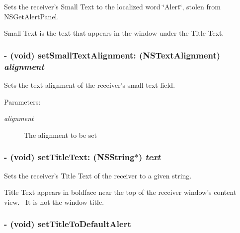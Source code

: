 Sets the receiver's Small Text to the localized word \char`\"{}Alert\char`\"{}, stolen from NSGetAlertPanel. 

Small Text is the text that appears in the window under the Title Text. \hypertarget{interface_s_s_y_alert_7742169df21e1a6a03f4efba3a913555}{
\subsubsection[{setSmallTextAlignment:}]{\setlength{\rightskip}{0pt plus 5cm}- (void) setSmallTextAlignment: (NSTextAlignment) {\em alignment}}}
\label{interface_s_s_y_alert_7742169df21e1a6a03f4efba3a913555}


Sets the text alignment of the receiver's small text field. 

\begin{Desc}
\item[Parameters:]
\begin{description}
\item[{\em alignment}]The alignment to be set \end{description}
\end{Desc}
\hypertarget{interface_s_s_y_alert_e215fbf01c8ec15042ec40bb23429482}{
\subsubsection[{setTitleText:}]{\setlength{\rightskip}{0pt plus 5cm}- (void) setTitleText: (NSString$\ast$) {\em text}}}
\label{interface_s_s_y_alert_e215fbf01c8ec15042ec40bb23429482}


Sets the receiver's Title Text of the receiver to a given string. 

Title Text appears in boldface near the top of the receiver window's content view.~ It is not the window title. \hypertarget{interface_s_s_y_alert_e816db2d738fc965ab7ff2210c174535}{
\subsubsection[{setTitleToDefaultAlert}]{\setlength{\rightskip}{0pt plus 5cm}- (void) setTitleToDefaultAlert }}
\label{interface_s_s_y_alert_e816db2d738fc965ab7ff2210c174535}


